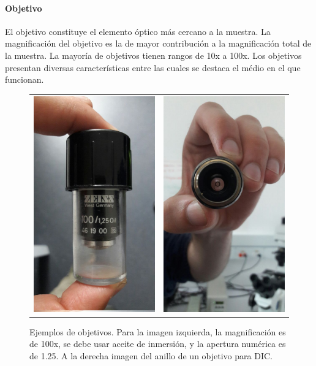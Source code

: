 \documentclass[addpoints,10pt]{exam}
\begin{document}
	\paragraph{Objetivo}
	El objetivo constituye el elemento \'optico m\'as cercano a la muestra. La magnificaci\'on del objetivo es la de mayor contribuci\'on a la magnificaci\'on total de la muestra. La mayor\'ia de objetivos tienen rangos de 10x a 100x. Los objetivos presentan diversas caracter\'isticas entre las cuales se destaca el m\'edio en el que funcionan.
	\begin{figure}[h]
		\centering
		\begin{tabular}{cc}
			\includegraphics[width = 0.2\linewidth]{objetivo.jpg} &
			\includegraphics[width = 0.2\linewidth]{DIC.jpg}
		\end{tabular}
		
		\caption{Ejemplos de objetivos. Para la imagen izquierda, la magnificaci\'on es de 100x, se debe usar aceite de inmersi\'on, y la apertura num\'erica es de 1.25. A la derecha imagen del anillo de un objetivo para DIC.}
	\end{figure}
	
\end{document}
